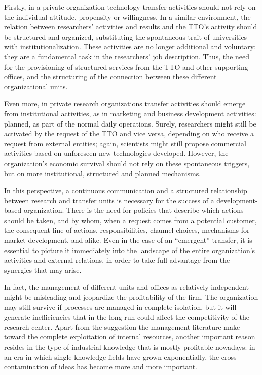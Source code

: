 Firstly, in a private organization technology transfer activities should not rely on the individual attitude, propensity or willingness. In a similar environment, the relation between researchers' activities and results and the TTO's activity should be structured and organized, substituting the spontaneous trait of universities with institutionalization. These activities are no longer additional and voluntary: they are a fundamental task in the researchers' job description. Thus, the need for the provisioning of structured services from the TTO and other supporting offices, and the structuring of the connection between these different organizational units. 

Even more, in private research organizations transfer activities should emerge from institutional activities, as in marketing and business development activities: planned, as part of the normal daily operations. Surely, researchers might still be activated by the request of the TTO and vice versa, depending on who receive a request from external entities; again, scientists might still propose commercial activities based on unforeseen new technologies developed. However, the organization's economic survival should not rely on these spontaneous triggers, but on more institutional, structured and planned mechanisms.

In this perspective, a continuous communication and a structured relationship between research and transfer units is necessary for the success of a development-based organization. There is the need for policies that describe which actions should be taken, and by whom, when a request comes from a potential customer, the consequent line of actions, responsibilities, channel choices, mechanisms for market development, and alike. Even in the case of an \enquote{emergent} transfer, it is essential to picture it immediately into the landscape of the entire organization's activities and external relations, in order to take full advantage from the synergies that may arise. 

In fact, the management of different units and offices as relatively independent might be misleading and jeopardize the profitability of the firm. The organization may still survive if processes are managed in complete isolation, but it will generate inefficiencies that in the long run could affect the competitivity of the research center. Apart from the suggestion the management literature make toward the complete exploitation of internal resources, another important reason resides in the type of industrial knowledge that is mostly profitable nowadays: in an era in which single knowledge fields have grown exponentially, the cross-contamination of ideas has become more and more important. 

